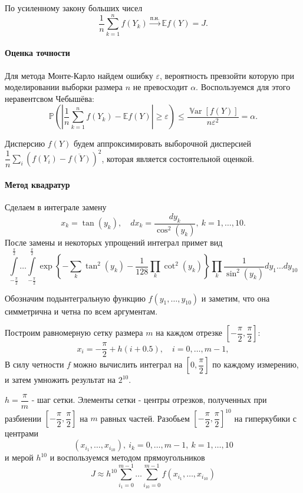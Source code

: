 \documentclass[16pt]{article}
\DeclareMathOperator*{\Var}{\mathbb{V}ar}
\newcommand\Sum[2]{\sum\limits_{#1}^{#2}}
\begin{document}
По усиленному закону больших чисел $$\dfrac1n \Sum{k=1}{n} f(Y_k) \overset{\text{п.н.}}{\rightarrow} \mathbb{E}f(Y) = J.$$

\paragraph{Оценка точности} Для метода Монте-Карло найдем ошибку $\varepsilon$, вероятность превзойти которую при моделировании выборки размера $n$ не превосходит $\alpha$. Воспользуемся для этого неравентсвом Чебышёва:
$$\mathbb{P}\left(\left|\dfrac{1}{n}\sum_{k=1}^nf(Y_k) - \mathbb{E}f(Y)\right| \geq \varepsilon \right) \leq \dfrac{\Var [f(Y)]}{n\varepsilon^2} = \alpha.$$

Дисперсию $f(Y)$ будем аппроксимировать выборочной дисперсией $\dfrac{1}{n}\sum\limits_i \left(f(Y_i) - \overline{f(Y)}\right)^2$, которая является состоятельной оценкой.

\paragraph{Метод квадратур} Сделаем в интеграле замену 
$$x_k = \tan\left(y_k\right), \quad dx_k = \dfrac{dy_k}{\cos^2\left(y_k\right)}, \ k = 1, \ldots, 10.$$
После замены и некоторых упрощений интеграл примет вид
$$\int\limits_{-\frac{\pi}{2}}^{\frac{\pi}{2}}\ldots\int\limits_{-\frac{\pi}{2}}^{\frac{\pi}{2}} \exp \left\{-\sum\limits_k \tan^2(y_k) - \dfrac{1}{128}\prod\limits_k \cot^2 (y_k)\right\}\prod\limits_k \dfrac{1}{\sin^2(y_k)}dy_1\ldots dy_{10}$$

Обозначим подынтегральную функцию $f(y_1, \ldots, y_{10})$ и заметим, что она симметрична и четна по всем аргументам.

Построим равномерную сетку размера $m$ на каждом отрезке $\left[-\dfrac{\pi}{2}, \dfrac{\pi}{2}\right]$:
$$x_i = -\frac{\pi}{2} + h(i + 0.5), \quad i = 0, \ldots, m-1,$$
В силу четности $f$ можно вычислить интеграл на $\left[0, \dfrac{\pi}2\right]$ по каждому измерению, и затем умножить результат на $2^{10}$.

$h = \dfrac{\pi}{m}$ - шаг сетки. Элементы сетки - центры отрезков, полученных при разбиении $\left[-\dfrac{\pi}{2}, \dfrac{\pi}{2}\right]$ на $m$ равных частей. Разобьем $\left[-\dfrac{\pi}{2}, \dfrac{\pi}{2}\right]^{10}$ на гиперкубики с центрами $$(x_{i_1}, \ldots, x_{i_{10}}),\ i_k = 0, \ldots, m-1,\ k = 1, \ldots, 10$$ и мерой $h^{10}$ и воспользуемся методом прямоугольников
$$J \approx h^{10}\sum_{i_1=0}^{m-1}\ldots\sum_{i_{10}=0}^{m-1}f(x_{i_1}, \ldots, x_{i_{10}})$$
\end{document}
